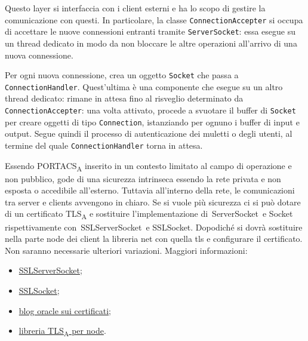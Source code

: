 Questo layer si interfaccia con i client esterni e ha lo scopo di gestire la comunicazione con questi. In particolare, la classe \texttt{ConnectionAccepter} si occupa di accettare le nuove connessioni entranti tramite \texttt{ServerSocket}: essa esegue su un thread dedicato in modo da non bloccare le altre operazioni all'arrivo di una nuova connessione.

Per ogni nuova connessione, crea un oggetto \texttt{Socket} che passa a \texttt{ConnectionHandler}. Quest'ultima è una componente che esegue su un altro thread dedicato: rimane in attesa fino al risveglio determinato da \texttt{ConnectionAccepter}: una volta attivato, procede a svuotare il buffer di \texttt{Socket} per creare oggetti di tipo \texttt{Connection}, istanziando per ognuno i buffer di input e output. Segue quindi il processo di autenticazione dei muletti o degli utenti, al termine del quale \texttt{ConnectionHandler} torna in attesa.

    Essendo PORTACS\textsubscript{A} inserito in un contesto limitato al campo di operazione e non pubblico, gode di una sicurezza intrinseca essendo la rete privata e non esposta o accedibile all'esterno. Tuttavia all'interno della rete, le comunicazioni tra server e clients avvengono in chiaro. Se si vuole più sicurezza ci si può dotare di un certificato TLS\textsubscript{A} e sostituire l'implementazione di ServerSocket e Socket rispettivamente con SSLServerSocket e SSLSocket. Dopodiché si dovrà sostituire nella parte node dei client la libreria net con quella tls e configurare il certificato. Non saranno necessarie ulteriori variazioni. Maggiori informazioni:
    \begin{itemize}
        \item \href{https://docs.oracle.com/en/java/javase/15/docs/api/java.base/javax/net/ssl/SSLServerSocket.html}{SSLServerSocket};
        \item \href{https://docs.oracle.com/en/java/javase/15/docs/api/java.base/javax/net/ssl/SSLSocket.html}{SSLSocket};
        \item \href{https://blogs.oracle.com/blogbypuneeth/steps-to-create-a-self-signed-certificate-using-openssl}{blog oracle sui certificati};
        \item \href{https://nodejs.org/api/tls.html}{libreria TLS\textsubscript{A} per node}.
    \end{itemize}





